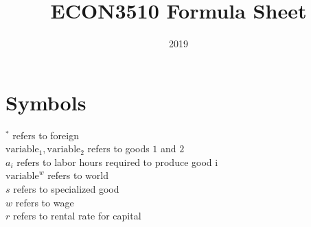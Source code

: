 \documentclass{article}
\title{ECON3510 Formula Sheet}
\date{2019}
\begin{document}
\maketitle

\section{Symbols}
$^{*}$ refers to foreign \\
$\text{variable}_{1},\text{variable}_{2}$ refers to goods $1$ and $2$ \\
$a_{i}$ refers to labor hours required to produce good i \\
$\text{variable}^{w}$ refers to world \\
$s$ refers to specialized good \\
$w$ refers to wage \\
$r$ refers to rental rate for capital \\

\newpage
\end{document}
